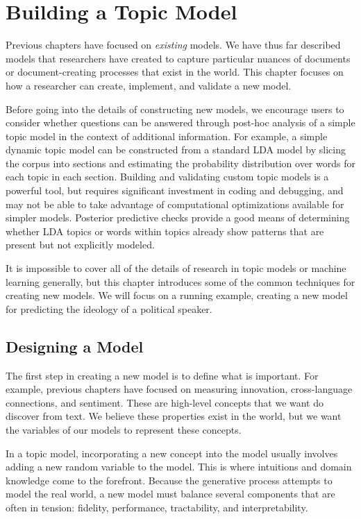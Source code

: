 \chapter{Building a Topic Model}
\label{ch:building}

Previous chapters have focused on \emph{existing} models.  
We have thus far described
models that researchers have created to capture particular nuances of documents or
document-creating processes that exist in the world.
This chapter focuses on how a researcher can create, implement, and
validate a new model. 

Before going into the details of constructing new models, we encourage users to consider whether questions can be answered through post-hoc analysis of a simple topic model in the context of additional information.
For example, a simple dynamic topic model can be constructed from a standard LDA model by slicing the corpus into sections and estimating the probability distribution over words for each topic in each section.
Building and validating custom topic models is a powerful tool, but requires significant investment in coding and debugging, and may not be able to take advantage of computational optimizations available for simpler models.
Posterior predictive checks \citep{mimno-11Bayesian} provide a good means of determining whether LDA topics or words within topics already show patterns that are present but not explicitly modeled.

It is impossible to cover all of the details of research in topic
models or machine learning generally, but this chapter introduces some
of the common techniques for creating new models.  We will focus on a
running example, creating a new model for predicting the
ideology of a political speaker.

\section{Designing a Model}

The first step in creating a new model is to define what is
important.  For example, previous chapters have focused on measuring
innovation, cross-language connections, and sentiment.  These are
high-level concepts that we want do discover from text.  We believe
these properties exist in the world, but we want the variables of our models to represent
these concepts.

In a topic model, incorporating a new concept into the model usually
involves adding a new random variable to the model.  This is where
intuitions and domain knowledge come to the forefront.  Because the
generative process attempts to model the real world, a new model must
balance several components that are often in tension: fidelity,
performance, tractability, and interpretability.

